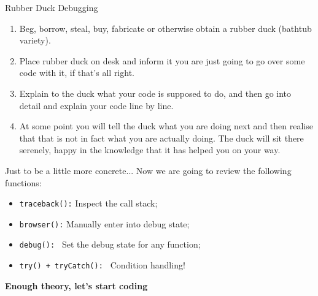 \documentclass[
hyperref={bookmarks=false},
xcolor={dvipsnames,svgnames*,x11names*}, 
12pt
]{beamer}
\begin{document}
\begin{frame}{Rubber Duck Debugging}
\vspace{-0.5cm}
{\small
\begin{enumerate}
\item Beg, borrow, steal, buy, fabricate or otherwise obtain a rubber duck (bathtub variety).
\item Place rubber duck on desk and inform it you are just going to go over some code with it, if that’s all right.
\item Explain to the duck what your code is supposed to do, and then go into detail and explain your code line by line.
\item At some point you will tell the duck what you are doing next and then realise that that is not in fact what you are actually doing. The duck will sit there serenely, happy in the knowledge that it has helped you on your way.
\end{enumerate}
}
\end{frame}

\begin{frame}{Just to be a little more concrete...}
\vspace{-0.5cm}
Now we are going to review the following functions: 
\begin{itemize}
\itemsep 3ex
\item \texttt{traceback():} Inspect the call stack;
\item \texttt{browser():} Manually enter into debug state;
\item \texttt{debug(): } Set the debug state for any function;
\item \texttt{try() + tryCatch(): } Condition handling! 
\end{itemize}
\end{frame}

\begin{frame}
	\vspace{2cm}
	\begin{center}
		\Huge
		\textbf{Enough theory, let's start coding }
	\end{center}
\end{frame}
\end{document}
